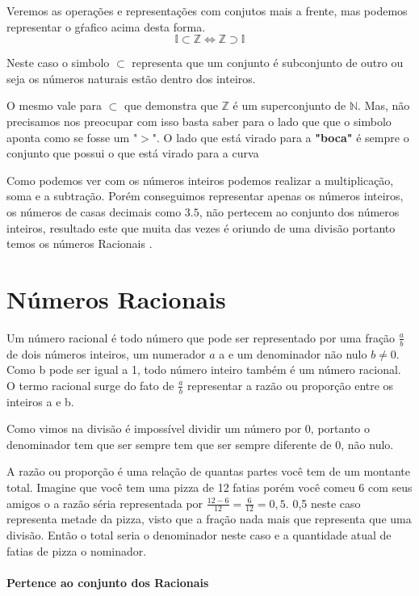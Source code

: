 \documentclass[letterpaper]{book}
\begin{document}
Veremos as operações e representações com conjutos mais a frente, mas podemos representar o gŕafico acima desta forma.
\[\mathbb{I} \subset \mathbb{Z} \iff \mathbb{Z} \supset \mathbb{I}\]

Neste caso o simbolo \(\subset\) representa 
que um conjunto é subconjunto de outro ou seja os números naturais estão dentro dos inteiros.

O mesmo vale para \(\subset\) que demonstra que \(\mathbb{Z}\)  é um superconjunto de \(\mathbb{N}\). Mas, não precisamos nos preocupar com isso basta saber para o lado que que o simbolo aponta como se fosse um "\(>\)". O lado que está virado para a \textbf{"boca"} é sempre o conjunto que possui o que está virado para a curva

Como podemos ver com os números inteiros podemos realizar a multiplicação, soma e a subtração. Porém conseguimos representar apenas os números inteiros, os números de casas decimais como \(3.5\), não pertecem ao conjunto dos números inteiros, resultado este que muita das vezes é oriundo de uma divisão portanto temos os números Racionais . 

\section{Números Racionais}

Um número racional é todo número que pode ser representado por uma fração \({\displaystyle {\frac {a}{b}}}\) de dois números inteiros, um numerador $a$ a e um denominador não nulo \(b \neq 0\). Como b pode ser igual a 1, todo número inteiro também é um número racional. O termo racional surge do fato de \({\displaystyle {\frac {a}{b}}}\) representar a razão ou proporção entre os inteiros a e b.

Como vimos na divisão é impossível dividir um número por 0, portanto o denominador tem que ser sempre tem que ser sempre diferente de 0, não nulo.

A razão ou proporção é uma relação de quantas partes você tem de um montante total. Imagine que você tem uma pizza de 12 fatias porém você comeu 6 com seus amigos o a razão séria representada por \(\frac{12 - 6}{12} = \frac{6}{12} = 0,5\). 0,5 neste caso representa metade da pizza, visto que a fração nada mais que representa que uma divisão. Então o total seria o denominador neste caso e a quantidade atual de fatias de pizza o nominador.   

\paragraph{Pertence ao conjunto dos Racionais}
\end{document}
